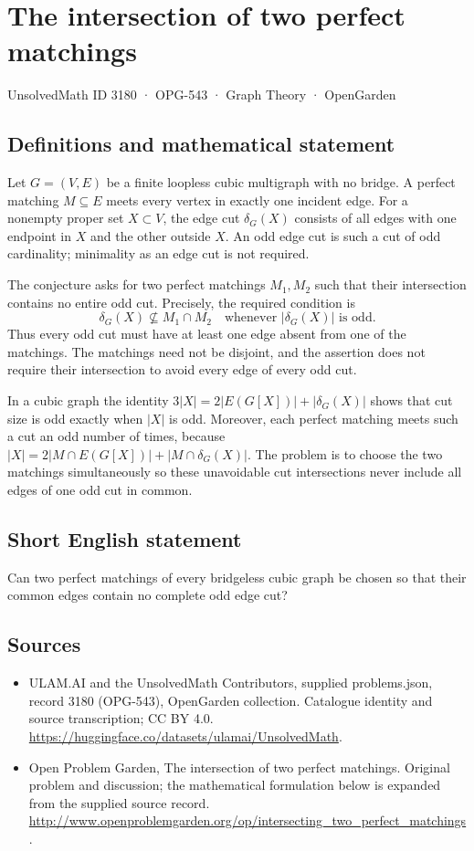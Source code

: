 \documentclass[11pt,a4paper]{article}
\begin{document}
\section*{The intersection of two perfect matchings}\label{3180}
{\small UnsolvedMath ID 3180 · OPG-543 · Graph Theory · OpenGarden}
\subsection{Definitions and mathematical statement}
Let $G=(V,E)$ be a finite loopless cubic multigraph with
no bridge. A perfect matching $M\subseteq E$ meets every
vertex in exactly one incident edge. For a nonempty proper
set $X\subset V$, the edge cut $\delta_G(X)$ consists of
all edges with one endpoint in $X$ and the other outside
$X$. An odd edge cut is such a cut of odd cardinality;
minimality as an edge cut is not required.

The conjecture asks for two perfect matchings $M_1,M_2$
such that their intersection contains no entire odd cut.
Precisely, the required condition is
\[
 \delta_G(X)\not\subseteq M_1\cap M_2
 \quad\text{whenever }|\delta_G(X)|\text{ is odd}.
\]
Thus every odd cut must have at least one edge absent
from one of the matchings. The matchings need not be
disjoint, and the assertion does not require their
intersection to avoid every edge of every odd cut.

In a cubic graph the identity
$3|X|=2|E(G[X])|+|\delta_G(X)|$ shows that cut size is
odd exactly when $|X|$ is odd. Moreover, each perfect
matching meets such a cut an odd number of times, because
$|X|=2|M\cap E(G[X])|+|M\cap\delta_G(X)|$.
The problem is to choose the two matchings simultaneously
so these unavoidable cut intersections never include
all edges of one odd cut in common.
\subsection{Short English statement}
Can two perfect matchings of every bridgeless cubic graph be chosen so that their common edges contain no complete odd edge cut?
\subsection{Sources}
\begin{itemize}
\item[S1] ULAM.AI and the UnsolvedMath Contributors, supplied problems.json, record 3180 (OPG-543), OpenGarden collection. Catalogue identity and source transcription; CC BY 4.0.
\url{https://huggingface.co/datasets/ulamai/UnsolvedMath}.
\item[S2] Open Problem Garden, The intersection of two perfect matchings. Original problem and discussion; the mathematical formulation below is expanded from the supplied source record.
\url{http://www.openproblemgarden.org/op/intersecting_two_perfect_matchings}.
\end{itemize}
\end{document}
